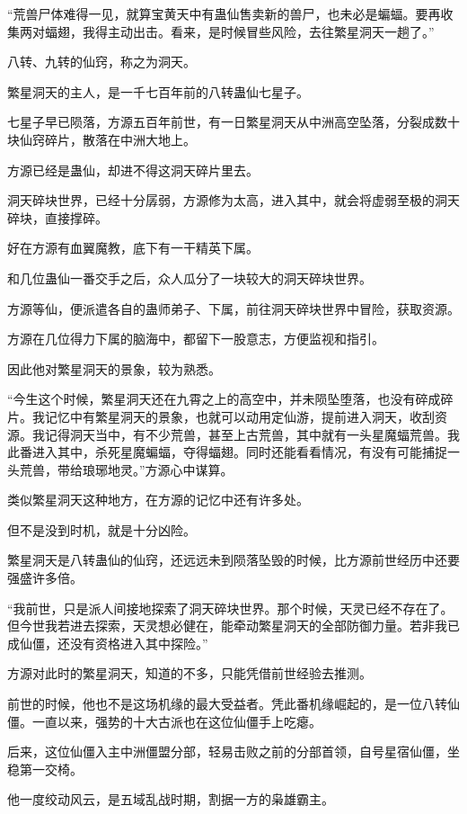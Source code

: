 \begin{this_body}
“荒兽尸体难得一见，就算宝黄天中有蛊仙售卖新的兽尸，也未必是蝙蝠。要再收集两对蝠翅，我得主动出击。看来，是时候冒些风险，去往繁星洞天一趟了。”

八转、九转的仙窍，称之为洞天。

繁星洞天的主人，是一千七百年前的八转蛊仙七星子。

七星子早已陨落，方源五百年前世，有一日繁星洞天从中洲高空坠落，分裂成数十块仙窍碎片，散落在中洲大地上。

方源已经是蛊仙，却进不得这洞天碎片里去。

洞天碎块世界，已经十分孱弱，方源修为太高，进入其中，就会将虚弱至极的洞天碎块，直接撑碎。

好在方源有血翼魔教，底下有一干精英下属。

和几位蛊仙一番交手之后，众人瓜分了一块较大的洞天碎块世界。

方源等仙，便派遣各自的蛊师弟子、下属，前往洞天碎块世界中冒险，获取资源。

方源在几位得力下属的脑海中，都留下一股意志，方便监视和指引。

因此他对繁星洞天的景象，较为熟悉。

“今生这个时候，繁星洞天还在九霄之上的高空中，并未陨坠堕落，也没有碎成碎片。我记忆中有繁星洞天的景象，也就可以动用定仙游，提前进入洞天，收刮资源。我记得洞天当中，有不少荒兽，甚至上古荒兽，其中就有一头星魔蝠荒兽。我此番进入其中，杀死星魔蝙蝠，夺得蝠翅。同时还能看看情况，有没有可能捕捉一头荒兽，带给琅琊地灵。”方源心中谋算。

类似繁星洞天这种地方，在方源的记忆中还有许多处。

但不是没到时机，就是十分凶险。

繁星洞天是八转蛊仙的仙窍，还远远未到陨落坠毁的时候，比方源前世经历中还要强盛许多倍。

“我前世，只是派人间接地探索了洞天碎块世界。那个时候，天灵已经不存在了。但今世我若进去探索，天灵想必健在，能牵动繁星洞天的全部防御力量。若非我已成仙僵，还没有资格进入其中探险。”

方源对此时的繁星洞天，知道的不多，只能凭借前世经验去推测。

前世的时候，他也不是这场机缘的最大受益者。凭此番机缘崛起的，是一位八转仙僵。一直以来，强势的十大古派也在这位仙僵手上吃瘪。

后来，这位仙僵入主中洲僵盟分部，轻易击败之前的分部首领，自号星宿仙僵，坐稳第一交椅。

他一度绞动风云，是五域乱战时期，割据一方的枭雄霸主。


\end{this_body}
